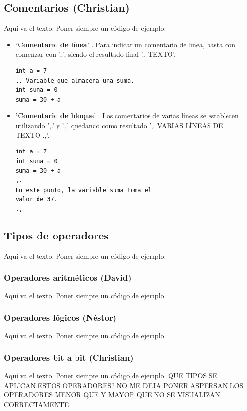 \documentclass[11pt, english]{article}
\begin{document}
\subsection{Comentarios (Christian)}
Aquí va el texto. Poner siempre un código de ejemplo.
\begin{itemize}
	\item \textbf{'Comentario de línea'} . Para indicar un comentario de línea, basta con comenzar con '..', siendo el resultado final '.. {TEXTO}'.
\begin{lstlisting}[frame=single]
int a = 7
.. Variable que almacena una suma.
int suma = 0
suma = 30 + a
\end{lstlisting}
	\item \textbf{'Comentario de bloque'} . Los comentarios de varias líneas se establecen utilizando ',.' y '.,'  quedando como resultado ',. {VARIAS LÍNEAS DE TEXTO} .,'.
\begin{lstlisting}[frame=single]
int a = 7
int suma = 0
suma = 30 + a
,.
En este punto, la variable suma toma el
valor de 37.
.,
\end{lstlisting}
\end{itemize}

\newpage

\subsection{Tipos de operadores}
Aquí va el texto. Poner siempre un código de ejemplo.

\subsubsection{Operadores aritméticos (David)}
Aquí va el texto. Poner siempre un código de ejemplo.

\subsubsection{Operadores lógicos (Néstor)}
Aquí va el texto. Poner siempre un código de ejemplo.

\subsubsection{Operadores bit a bit (Christian)}
Aquí va el texto. Poner siempre un código de ejemplo.
QUE TIPOS SE APLICAN ESTOS OPERADORES?
\newline
NO ME DEJA PONER ASPERSAN
\newline
LOS OPERADORES MENOR QUE Y MAYOR QUE NO SE VISUALIZAN CORRECTAMENTE
 
\end{document}

